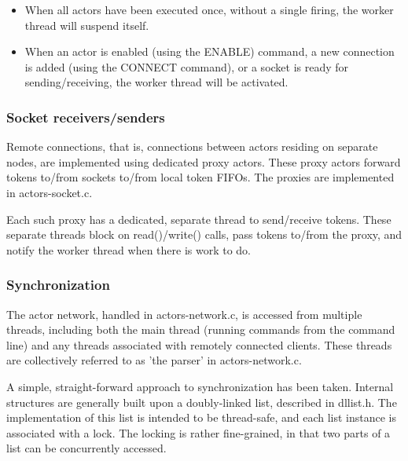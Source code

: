 \documentclass[10pt, a4paper]{article}
\begin{document}
\begin{itemize}
\item When all actors have been executed once, without a single
  firing, the worker thread will suspend itself.
\item When an actor is enabled (using the ENABLE) command, a new
  connection is added (using the CONNECT command), or a socket is
  ready for sending/receiving, the worker thread will be activated.
\end{itemize}

\subsubsection*{Socket receivers/senders}

Remote connections, that is, connections between actors residing on
separate nodes, are implemented using dedicated proxy actors. These
proxy actors forward tokens to/from sockets to/from local token
FIFOs. The proxies are implemented in actors-socket.c.

Each such proxy has a dedicated, separate thread to send/receive
tokens. These separate threads block on read()/write() calls, pass
tokens to/from the proxy, and notify the worker thread when there is
work to do.

\subsubsection*{Synchronization}

The actor network, handled in actors-network.c, is accessed from
multiple threads, including both the main thread (running commands
from the command line) and any threads associated with remotely
connected clients. These threads are collectively referred to as 'the
parser' in actors-network.c.

A simple, straight-forward approach to synchronization has been
taken. Internal structures are generally built upon a doubly-linked
list, described in dllist.h. The implementation of this list is
intended to be thread-safe, and each list instance is associated with
a lock. The locking is rather fine-grained, in that two parts of a
list can be concurrently accessed.
\end{document}
